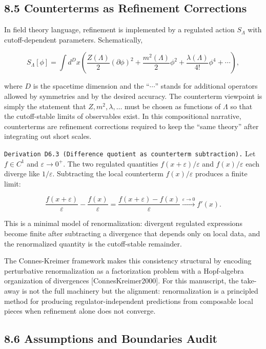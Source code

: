 \documentclass[
]{article}
\begin{document}
\subsection{8.5 Counterterms as Refinement
Corrections}\label{counterterms-as-refinement-corrections}

In field theory language, refinement is implemented by a regulated
action \(S_\Lambda\) with cutoff-dependent parameters. Schematically,

\[
S_\Lambda[\phi]
=
\int d^D x\left(
\frac{Z(\Lambda)}{2}(\partial\phi)^2
+\frac{m^2(\Lambda)}{2}\phi^2
+\frac{\lambda(\Lambda)}{4!}\phi^4
+\cdots
\right),
\]

where \(D\) is the spacetime dimension and the ``\(\cdots\)'' stands for
additional operators allowed by symmetries and by the desired accuracy.
The counterterm viewpoint is simply the statement that
\(Z,m^2,\lambda,\ldots\) must be chosen as functions of \(\Lambda\) so
that the cutoff-stable limits of observables exist. In this
compositional narrative, counterterms are refinement corrections
required to keep the ``same theory'' after integrating out short scales.

\texttt{Derivation\ D6.3\ (Difference\ quotient\ as\ counterterm\ subtraction).}
Let \(f\in C^1\) and \(\varepsilon\to 0^+\). The two regulated
quantities \(f(x+\varepsilon)/\varepsilon\) and \(f(x)/\varepsilon\)
each diverge like \(1/\varepsilon\). Subtracting the local counterterm
\(f(x)/\varepsilon\) produces a finite limit:

\[
\frac{f(x+\varepsilon)}{\varepsilon}-\frac{f(x)}{\varepsilon}
=\frac{f(x+\varepsilon)-f(x)}{\varepsilon}
\xrightarrow{\varepsilon\to0} f'(x).
\]

This is a minimal model of renormalization: divergent regulated
expressions become finite after subtracting a divergence that depends
only on local data, and the renormalized quantity is the cutoff-stable
remainder.

The Connes-Kreimer framework makes this consistency structural by
encoding perturbative renormalization as a factorization problem with a
Hopf-algebra organization of divergences {[}ConnesKreimer2000{]}. For
this manuscript, the take-away is not the full machinery but the
alignment: renormalization is a principled method for producing
regulator-independent predictions from composable local pieces when
refinement alone does not converge.

\subsection{8.6 Assumptions and Boundaries
Audit}\label{assumptions-and-boundaries-audit}
\end{document}

